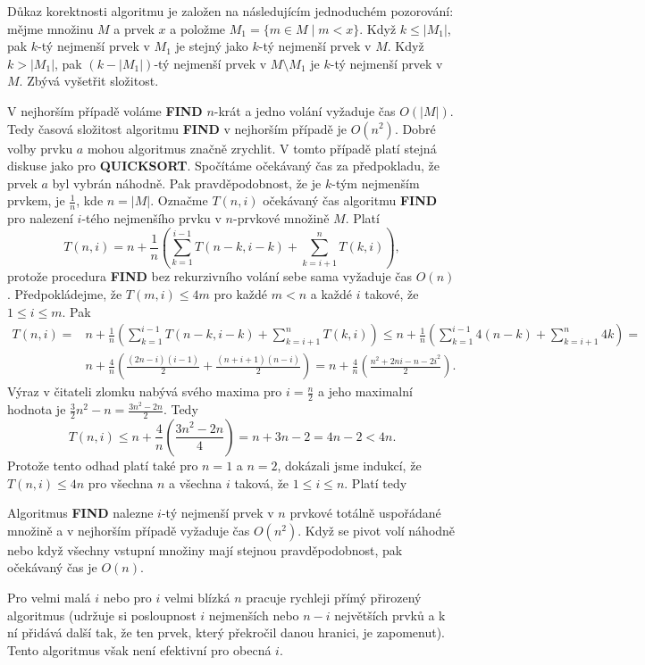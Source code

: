 \documentclass[a4paper,12pt]{article}
\begin{document}
Důkaz korektnosti algoritmu je založen na následujícím 
jednoduchém pozorování: mějme množinu $M$ a prvek $
x$ a 
položme $M_1=\{m\in M\mid m<x\}$. Když $k\le |M_1|$, pak $k$-tý 
nejmenší 
prvek v $M_1$ je stejný jako $k$-tý nejmenší prvek v $
M$. Když 
$k>|M_1|$, pak $(k-|M_1|)$-tý nejmenší prvek v $M\setminus 
M_1$ je $k$-tý 
nejmenší prvek v $M$.  
Zbývá vyšetřit složitost.

V nejhorším případě 
voláme {\bf FIND} $n$-krát a jedno volání vyžaduje čas $
O(|M|)$.  
Tedy časová složitost algoritmu 
{\bf FIND} v nejhorším případě je $O(n^2)$.  Dobré volby 
prvku $a$ mohou algoritmus značně zrychlit.  V tomto 
případě platí stejná 
diskuse jako pro {\bf QUICKSORT}.  Spočítáme očekávaný čas 
za předpokladu, že  
pr\-vek $a$ byl vybrán náhodně.  Pak pravděpodobnost, že je 
$k$-tým nejmenším prvkem, je $\frac 1n$, kde $n=|M|$.  Označme $
T(n,i)$ 
očekávaný čas algoritmu {\bf FIND} pro nalezení $i$-tého nejmenšího 
prvku v $n$-prvkové množině $M$.  Platí 
$$T(n,i)=n+\frac 1n(\sum_{k=1}^{i-1}T(n-k,i-k)+\sum_{k=i+1}^nT(k,
i)),$$
protože procedura {\bf FIND} bez rekurzivního volání sebe sama 
vyžaduje čas $O(n)$. Předpoklá\-dej\-me, že $T(m,i)
\le 4m$ 
pro každé $m<n$ a každé $i$ takové, že $1\le i\le 
m$. Pak 
\begin{align*} T(n,i)=&n+\frac 1n(\sum_{k=1}^{i-1}T(n-k,i-k)+\sum_{k=i+
1}^nT(k,i))\le n+\frac 1n(\sum_{k=1}^{i-1}4(n-k)+\sum_{k=i+1}^n4k
)=\\
&n+\frac 4n(\frac {(2n-i)(i-1)}2+\frac {(n+i+1)(n-i)}2)=n+\frac 4
n(\frac {n^2+2ni-n-2i^2}2).\end{align*}
Výraz v čitateli zlomku nabývá svého maxima pro 
$i=\frac n2$ a jeho maximalní hodnota je 
$\frac 32n^2-n=\frac {3n^2-2n}2$. Tedy
$$T(n,i)\le n+\frac 4n(\frac {3n^2-2n}4)=n+3n-2=4n-2<4n.$$
Protože tento odhad platí také pro $n=1$ a $n=2$, dokázali 
jsme indukcí, že $T(n,i)\le 4n$ pro všechna $n$ a všechna $
i$ 
taková, že $1\le i\le n$. Platí tedy 

\begin{veta}Algoritmus {\bf FIND} nalezne $i$-tý nejmenší 
prvek v $n$ prv\-kové totálně uspořádané mno\-ži\-ně a v nejhorším 
případě vyža\-du\-je čas $O(n^2)$. Když se pivot volí 
náhodně nebo když všechny vstupní množiny mají stejnou 
pravděpodobnost, pak očekávaný čas je $O(n)$.
\end{veta}

Pro velmi malá $i$ nebo pro $i$ velmi blízká $n$ 
pracuje rychleji přímý přirozený algoritmus (udržuje si 
posloupnost $i$ nejmen\-ších nebo $n-i$ největších prvků 
a k ní přidává další tak, že ten prvek, který pře\-kročil 
danou hranici, je 
zapomenut). Tento algoritmus však není 
efektivní pro obecná $i$. 
\end{document}
